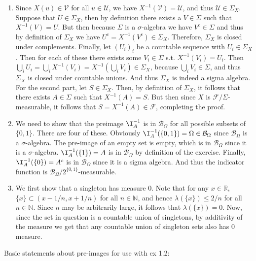 \begin{enumerate}[resume*]
\begin{ungradedsolution}
\begin{enumerate}
\begin{itemize}
            \end{itemize}
            \item Since $X(u) \in \mathcal{V}$ for all $u \in \mathcal{U}$, we have $X^{-1}(\mathcal{V}) = \mathcal{U}$, and thus $\mathcal{U} \in \Sigma_X$. Suppose that $U \in \Sigma_X$, then by definition there exists a $V \in \Sigma$ such that $X^{-1}(V) = U$. But then because $\Sigma$ is a $\sigma$-algebra we have $V^c \in \Sigma$ and thus by definition of $\Sigma_X$ we have $U^c = X^{-1}(V^c) \in \Sigma_X$. Therefore, $\Sigma_X$ is closed under complements. Finally, let $(U_i)_i$ be a countable sequence with $U_i \in \Sigma_X$. Then for each of these there exists some $V_i \in \Sigma$ s.t. $X^{-1}(V_i) = U_i$. Then $\bigcup_i U_i = \bigcup_i X^{-1}(V_i) = X^{-1}(\bigcup_i V_i) \in \Sigma_X$, because $\bigcup_i V_i \in \Sigma$, and thus $\Sigma_X$ is closed under countable unions. And thus $\Sigma_X$ is indeed a sigma algebra.\\
            For the second part, let $S \in \Sigma_X$. Then, by definition of $\Sigma_X$, it follows that there exists $A \in \Sigma$ such that $X^{-1}(A) = S$. But then since $X$ is $\mathcal{F}/\Sigma$-measurable, it follows that $S = X^{-1}(A) \in \mathcal{F}$, completing the proof.
            \item We need to show that the preimage $\I_A^{-1}$ is in $\mathcal{B}_{\Omega}$ for all possible subsets of $\{0, 1\}$. There are four of these. Obviously $\I_A^{-1}(\{0,1\}) = \Omega \in \mathcal{B}_{\Omega}$ since $\mathcal{B}_{\Omega}$ is a $\sigma$-algebra. The pre-image of an empty set is empty, which is in $\mathcal{B}_{\Omega}$ since it is a $\sigma$-algebra. $\I_A^{-1}(\{1\}) = A$ is in $\mathcal{B}_{\Omega}$ by definition of the exercise. Finally, $\I_A^{-1}(\{0\}) = A^c$ is in $\mathcal{B}_{\Omega}$ since it is a sigma algebra. And thus the indicator function is $\mathcal{B}_{\Omega} / 2^{\{0,1\}}$-measurable.
            \item We first show that a singleton has measure $0$. Note that for any $x \in \mathbb{R}$, $\{x\} \subset (x - 1/n, x+1/n)$ for all $n \in \mathbb{N}$, and hence $\lambda(\{x\}) \leq 2/n$ for all $n \in \mathbb{N}$. Since $n$ may be arbitrarily large, it follows that $\lambda(\{x\}) = 0$. Now, since the set in question is a countable union of singletons, by additivity of the measure we get that any countable union of singleton sets also has $0$ measure.
        \end{enumerate}
        Basic statements about pre-images for use with ex 1.2:
        \begin{enumerate}

\end{enumerate}
\end{ungradedsolution}
\end{enumerate}
